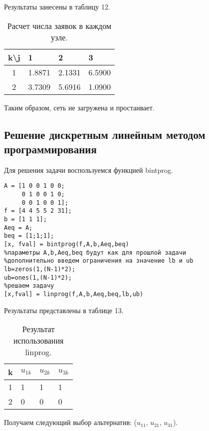 Результаты занесены в таблицу 12.

\begin{table}[htb]
	\begin{tabularx}{\textwidth}{|c|X|X|X|}
	\hline 
	k\textbackslash{}j & 1 & 2 & 3 \\ 
	\hline 
	1 & 1.8871 & 2.1331 & 6.5900 \\ 
	\hline 
	2 & 3.7309 & 5.6916 & 1.0900 \\ 
	\hline 
	\end{tabularx}
\caption{Расчет числа заявок в каждом узле.}
\end{table}

Таким образом, сеть не загружена и простаивает.

\subsection{Решение дискретным линейным методом программирования}

Для решения задачи воспользуемся функцией bintprog.

\begin{Verbatim}[frame=single]
%Зададим входные параметры
A = [1 0 0 1 0 0;
     0 1 0 0 1 0;
     0 0 1 0 0 1];
f = [4 4 5 5 2 31];
b = [1 1 1];
Aeq = A;
beq = [1;1;1];
[x, fval] = bintprog(f,A,b,Aeq,beq)
%параметры A,b,Aeq,beq будут как для прошлой задачи
%дополнительно введем ограничения на значение lb и ub
lb=zeros(1,(N-1)*2);
ub=ones(1,(N-1)*2);
%решаем задачу
[x,fval] = linprog(f,A,b,Aeq,beq,lb,ub)
\end{Verbatim}

Результаты представлены в таблице 13.

\begin{table}[htb]
	\begin{tabularx}{\textwidth}{|c|X|X|X|}
	\hline 
	k & $u_{1k}$ & $u_{2k}$ & $u_{3k}$ \\ 
	\hline 
	1 & 1 & 1 & 1 \\ 
	\hline 
	2 & 0 & 0 & 0 \\ 
	\hline 
	\end{tabularx}
\caption{Результат использования linprog.}
\end{table}

Получаем следующий выбор альтернатив: ($u_{11}$, $u_{21}$, $u_{31}$).
